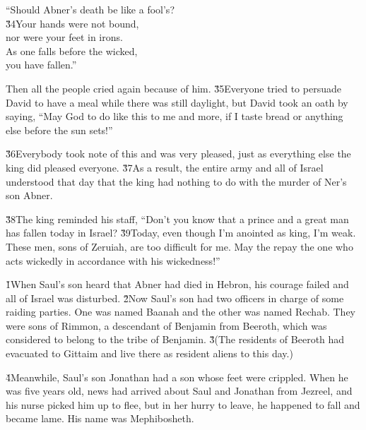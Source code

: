 \begin{poetry}
\poeml ``Should Abner's death be like a fool's? \\
\poeml \v{34}Your hands were not bound, \\
\poemlll       nor were your feet in irons. \\
\poeml As one falls before the wicked, \\
\poemll    you have fallen.''
\end{poetry}

Then all the people cried again because of him. \v{35}Everyone tried to persuade David to have a meal while there was still daylight, but David took an oath by saying, ``May God to do like this to me and more, if I taste bread or anything else before the sun sets!''

\v{36}Everybody took note of this and was very pleased, just as everything else the king did pleased everyone. \v{37}As a result, the entire army and all of Israel understood that day that the king had nothing to do with the murder of Ner's son Abner.

\v{38}The king reminded his staff, ``Don't you know that a prince and a great man has fallen today in Israel? \v{39}Today, even though I'm anointed as king, I'm weak. These men, sons of Zeruiah, are too difficult for me. May the  repay the one who acts wickedly in accordance with his wickedness!''

\v{1}When Saul's son heard that Abner had died in Hebron, his courage failed and all of Israel was disturbed. \v{2}Now Saul's son had two officers in charge of some raiding parties. One was named Baanah and the other was named Rechab. They were sons of Rimmon, a descendant of Benjamin from Beeroth, which was considered to belong to the tribe of Benjamin. \v{3}(The residents of Beeroth had evacuated to Gittaim and live there as resident aliens to this day.)

\v{4}Meanwhile, Saul's son Jonathan had a son whose feet were crippled. When he was five years old, news had arrived about Saul and Jonathan from Jezreel, and his nurse picked him up to flee, but in her hurry to leave, he happened to fall and became lame. His name was Mephibosheth.


